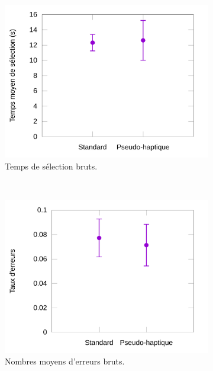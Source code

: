 	
	\begin{figure}[!htb]
		\begin{subfigure}[t]{0.49\textwidth}
			\centering
			\includegraphics[width=\textwidth]{figures/ch5/phRawTimes}
			\caption{Temps de sélection bruts.}
			\label{fig:phRawTimes}
		\end{subfigure}
		~
		\begin{subfigure}[t]{0.49\textwidth}
			\centering
			\includegraphics[width=\textwidth]{figures/ch5/phRawErrors}
			\caption{Nombres moyens d'erreurs bruts.}
			\label{fig:phRawErrors}
		\end{subfigure}
		~
		\begin{subfigure}[t]{0.49\textwidth}
			\centering

\end{subfigure}
\end{figure}
